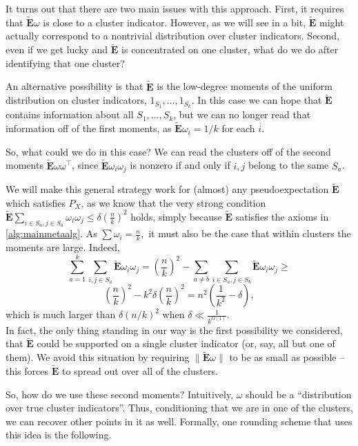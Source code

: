 \documentclass[12pt]{article}%
\newcommand{\pseudoexpect}{\tilde{\mathbf{E}}}
\begin{document}
\noindent
It turns out that there are two main issues with this approach. First, it requires that $\pseudoexpect\omega$ is close to a cluster indicator. However, as we will see in a bit, $\pseudoexpect$ might actually correspond to a nontrivial distribution over cluster indicators.
Second, even if we get lucky and $\pseudoexpect$ is concentrated on one cluster, what do we do after identifying that one cluster?

An alternative possibility is that $\pseudoexpect$ is the low-degree moments of the uniform distribution on cluster indicators, $1_{S_1},\ldots,1_{S_k}$.
In this case we can hope that $\pseudoexpect$ contains information about all $S_1,\ldots,S_k$, but we can no longer read that information off of the first moments, as $\pseudoexpect \omega_i = 1/k$ for each $i$.

So, what could we do in this case? We can read the clusters off of the second moments $\pseudoexpect \omega \omega^\top$, since $\pseudoexpect \omega_i \omega_j$ is nonzero if and only if $i,j$ belong to the same $S_a$.

We will make this general strategy work for (almost) any pseudoexpectation $\pseudoexpect$ which satisfies $P_X$, as we know that the very strong condition $\pseudoexpect \sum_{i\in S_a, j \in S_a}\omega_i\omega_j \le \delta \left(\frac{n}{k}\right)^2$ holds, simply because $\pseudoexpect$ satisfies the axioms in \cref{alg:mainmetaalg}. As $\sum \omega_i = \frac{n}{k},$ it must also be the case that within clusters the moments are large. Indeed, 
$$
\sum_{a = 1}^k 
\sum_{i,j\in S_a}\pseudoexpect\omega_i\omega_j = 
\left(\frac{n}{k}\right)^2
 - \sum_{a \neq b}
\sum_{i\in S_a, j \in S_b}\pseudoexpect\omega_i\omega_j \ge
$$
$$
\left(\frac{n}{k}\right)^2 - k^2\delta \left(\frac{n}{k}\right)^2  = 
n^2 (\frac{1}{k^2}-\delta),
$$
which is much larger than $\delta (n/k)^2$ when $\delta \ll \frac{1}{k^{O(1)}}.$\\

In fact, the only thing standing in our way is the first possibility we considered, that $\pseudoexpect$ could be supported on a single cluster indicator (or, say, all but one of them).
We avoid this situation by requiring $\| \pseudoexpect \omega \|$ to be as small as possible -- this forces $\pseudoexpect$ to spread out over all of the clusters.

\noindent
So, how do we use these second moments? Intuitively, $\omega$ should be a ``distribution over true cluster indicators''. Thus, conditioning that we are in one of the clusters, we can recover other points in it as well. Formally, one rounding scheme that uses this idea is the following.
\end{document}
